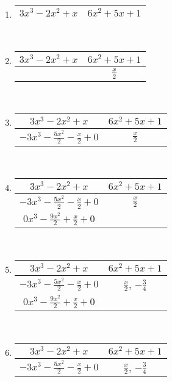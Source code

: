 \documentclass[11pt]{article}
\begin{document}
\begin{enumerate}
    \item \begin{tabular}{c|c}
        $3x^3-2x^2+x$ & $6x^2+5x+1$\\
        \hline
    \end{tabular}\\
    \item \begin{tabular}{c|c}
        $3x^3-2x^2+x$ & $6x^2+5x+1$\\
        \hline
                    & $\frac{x}{2}$\\
        \hline
    \end{tabular}\\
    \item \begin{tabular}{c|c}
        $3x^3-2x^2+x$ & $6x^2+5x+1$\\
        \hline
        $-3x^3 -\frac{5x^{2}}{2} - \frac{x}{2} + 0$ & $\frac{x}{2}$\\
        \hline
    \end{tabular}\\
    \item \begin{tabular}{c|c}
        $3x^3-2x^2+x$ & $6x^2+5x+1$\\
        \hline
        $-3x^3 -\frac{5x^{2}}{2} - \frac{x}{2} + 0$ & $\frac{x}{2}$\\
        \hline
        $0x^3 -\frac{9x^{2}}{2} + \frac{x}{2} + 0$ & \\
        \hline
    \end{tabular}\\
    \item \begin{tabular}{c|c}
        $3x^3-2x^2+x$ & $6x^2+5x+1$\\
        \hline
        $-3x^3 -\frac{5x^{2}}{2} - \frac{x}{2} + 0$ & $\frac{x}{2}$, $-\frac{3}{4}$\\
        \hline
        $0x^3 -\frac{9x^{2}}{2} + \frac{x}{2} + 0$ & \\
        \hline
    \end{tabular}\\
    \item \begin{tabular}{c|c}
        $3x^3-2x^2+x$ & $6x^2+5x+1$\\
        \hline
        $-3x^3 -\frac{5x^{2}}{2} - \frac{x}{2} + 0$ & $\frac{x}{2}$, $-\frac{3}{4}$\\

\end{tabular}
\end{enumerate}
\end{document}
